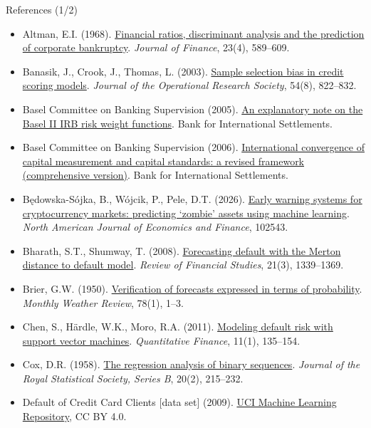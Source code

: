 \begin{frame}{References (1/2)}
\itemsize{\tiny}
\begin{itemize}
    \item Altman, E.I. (1968). \href{https://doi.org/10.1111/j.1540-6261.1968.tb00843.x}{Financial ratios, discriminant analysis and the prediction of corporate bankruptcy}. \textit{Journal of Finance}, 23(4), 589--609.
    \item Banasik, J., Crook, J., Thomas, L. (2003). \href{https://doi.org/10.1057/palgrave.jors.2601578}{Sample selection bias in credit scoring models}. \textit{Journal of the Operational Research Society}, 54(8), 822--832.
    \item Basel Committee on Banking Supervision (2005). \href{https://www.bis.org/bcbs/irbriskweight.htm}{An explanatory note on the Basel II IRB risk weight functions}. Bank for International Settlements.
    \item Basel Committee on Banking Supervision (2006). \href{https://www.bis.org/publ/bcbs128.htm}{International convergence of capital measurement and capital standards: a revised framework (comprehensive version)}. Bank for International Settlements.
    \item Będowska-Sójka, B., Wójcik, P., Pele, D.T. (2026). \href{https://doi.org/10.1016/j.najef.2025.102543}{Early warning systems for cryptocurrency markets: predicting `zombie' assets using machine learning}. \textit{North American Journal of Economics and Finance}, 102543.
    \item Bharath, S.T., Shumway, T. (2008). \href{https://doi.org/10.1093/rfs/hhn044}{Forecasting default with the Merton distance to default model}. \textit{Review of Financial Studies}, 21(3), 1339--1369.
    \item Brier, G.W. (1950). \href{https://doi.org/10.1175/1520-0493(1950)078<0001:VOFEIT>2.0.CO;2}{Verification of forecasts expressed in terms of probability}. \textit{Monthly Weather Review}, 78(1), 1--3.
    \item Chen, S., Härdle, W.K., Moro, R.A. (2011). \href{https://doi.org/10.1080/14697680903410015}{Modeling default risk with support vector machines}. \textit{Quantitative Finance}, 11(1), 135--154.
    \item Cox, D.R. (1958). \href{https://doi.org/10.1111/j.2517-6161.1958.tb00292.x}{The regression analysis of binary sequences}. \textit{Journal of the Royal Statistical Society, Series B}, 20(2), 215--232.
    \item Default of Credit Card Clients [data set] (2009). \href{https://doi.org/10.24432/C55S3H}{UCI Machine Learning Repository}, CC BY 4.0.

\end{itemize}
\end{frame}
